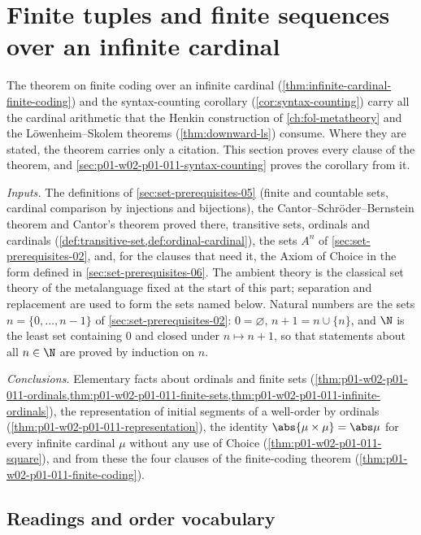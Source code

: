 \section{Finite tuples and finite sequences over an infinite cardinal}
\label{sec:p01-w02-p01-011-finite-coding}

The theorem on finite coding over an infinite cardinal
(\cref{thm:infinite-cardinal-finite-coding}) and the syntax-counting
corollary (\cref{cor:syntax-counting}) carry all the cardinal arithmetic that
the Henkin construction of \cref{ch:fol-metatheory} and the
L\"owenheim--Skolem theorems (\cref{thm:downward-ls}) consume. Where they are
stated, the theorem carries only a citation. This section proves every clause
of the theorem, and \cref{sec:p01-w02-p01-011-syntax-counting} proves the
corollary from it.

\emph{Inputs.} The definitions of \cref{sec:set-prerequisites-05}
(finite and countable sets, cardinal comparison by injections and
bijections), the Cantor--Schr\"oder--Bernstein theorem and Cantor's theorem
proved there, transitive sets, ordinals and cardinals
(\cref{def:transitive-set,def:ordinal-cardinal}), the sets \(A^n\) of
\cref{sec:set-prerequisites-02}, and, for the clauses that need it, the
Axiom of Choice in the form defined in \cref{sec:set-prerequisites-06}.
The ambient theory is the classical set theory of the metalanguage fixed at
the start of this part; separation and replacement are used to form the
sets named below. Natural numbers are the sets
\(n=\{0,\ldots,n-1\}\) of \cref{sec:set-prerequisites-02}: \(0=\varnothing\),
\(n+1=n\cup\{n\}\), and \(\N\) is the least set containing \(0\) and closed
under \(n\mapsto n+1\), so that statements about all \(n\in\N\) are proved by
induction on \(n\).

\emph{Conclusions.} Elementary facts about ordinals and finite sets
(\cref{thm:p01-w02-p01-011-ordinals,thm:p01-w02-p01-011-finite-sets,thm:p01-w02-p01-011-infinite-ordinals}),
the representation of initial segments of a well-order by ordinals
(\cref{thm:p01-w02-p01-011-representation}), the identity
\(\abs{\mu\times\mu}=\abs\mu\) for every infinite cardinal \(\mu\) without
any use of Choice (\cref{thm:p01-w02-p01-011-square}), and from these the
four clauses of the finite-coding theorem
(\cref{thm:p01-w02-p01-011-finite-coding}).

\subsection{Readings and order vocabulary}
\label{sec:p01-w02-p01-011-readings}

